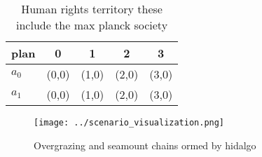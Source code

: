 \documentclass[a4paper]{article}
\begin{document}
\begin{table}
\begin{adjustbox}{width=0.5\columnwidth}
\begin{tabular}{|l|l|l|l|l|}
\hline
\textbf{plan} & \multicolumn{1}{c|}{\textbf{0}} & \multicolumn{1}{c|}{\textbf{1}} & \multicolumn{1}{c|}{\textbf{2}} & \multicolumn{1}{c|}{\textbf{3}} \\ \hline
\textbf{$a_0$}  & (0,0) & (1,0) & (2,0) & (3,0) \\ \hline
\textbf{$a_1$}  & (0,0) & (1,0) & (2,0) & (3,0) \\ \hline
\end{tabular}
\end{adjustbox}
\caption{Human rights territory these include the max planck society
}
\end{table}

\begin{figure}
\centering
\texttt{[image: ../scenario\_visualization.png]}
\caption{Overgrazing and seamount chains ormed by hidalgo 
}
\end{figure}
 
\end{document}
